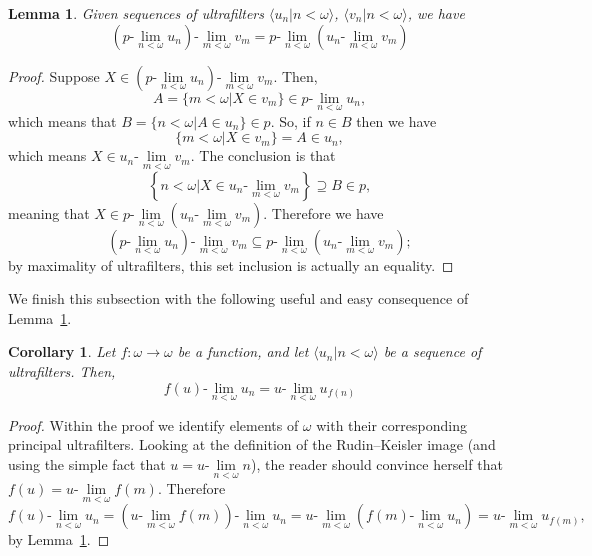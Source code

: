 \documentclass[10pt]{amsart}
\newcommand{\ulim}[2]{#1\text{-}\lim\limits_{#2<\omega}}
\newtheorem{lemma}[theorem]{Lemma}
\newtheorem{corollary}[theorem]{Corollary}
\theoremstyle{definition}
\theoremstyle{remark}
\begin{document}
\begin{lemma}\label{lem:iteratedulims}
    Given sequences of ultrafilters $\langle u_n\big|n<\omega\rangle$, $\langle v_n\big|n<\omega\rangle$, we have
\begin{equation*}
\ulim{\left(\ulim{p}{n}u_n\right)}{m} v_m=\ulim{p}{n}\left(\ulim{u_n}{m} v_m\right)
\end{equation*}
\end{lemma}

\begin{proof}
    Suppose $X\in\ulim{\left(\ulim{p}{n}u_n\right)}{m}v_m$. Then,
    \begin{equation*}
        A=\{m<\omega\big|X\in v_m\}\in\ulim{p}{n} u_n,
    \end{equation*}
    which means that $B=\{n<\omega\big|A\in u_n\}\in p$. So, if $n\in B$ then we have
    \begin{equation*}
        \{m<\omega\big|X\in v_m\}=A\in u_n,
    \end{equation*}
    which means $X\in\ulim{u_n}{m}v_m$. The conclusion is that
    \begin{equation*}
        \left\{n<\omega\big|X\in\ulim{u_n}{m}v_m\right\}\supseteq B\in p,
    \end{equation*}
    meaning that $X\in\ulim{p}{n}\left(\ulim{u_n}{m} v_m\right)$. Therefore we have
    \begin{equation*}
    \ulim{\left(\ulim{p}{n}u_n\right)}{m} v_m\subseteq\ulim{p}{n}\left(\ulim{u_n}{m} v_m\right);
    \end{equation*}
    by maximality of ultrafilters, this set inclusion is actually an equality.
\end{proof}

We finish this subsection with the following useful and easy consequence of Lemma~\ref{lem:iteratedulims}.

\begin{corollary}\label{lem:f(u)limit}
    Let $f:\omega\longrightarrow\omega$ be a function, and let $\langle u_n\big|n<\omega\rangle$ be a sequence of ultrafilters. Then,
    \begin{equation*}
        \ulim{f(u)}{n}u_n=\ulim{u}{n}u_{f(n)}
    \end{equation*}
\end{corollary}

\begin{proof}
    Within the proof we identify elements of $\omega$ with their corresponding principal ultrafilters. Looking at the definition of the Rudin--Keisler image (and using the simple fact that $u=\ulim{u}{n}n$), the reader should convince herself that $f(u)=\ulim{u}{m}f(m)$. Therefore
    \begin{equation*}
    \ulim{f(u)}{n}u_n=\ulim{\left(\ulim{u}{m}f(m)\right)}{n}u_n=\ulim{u}{m}\left(\ulim{f(m)}{n} u_n\right)=\ulim{u}{m}u_{f(m)},
    \end{equation*}
    by Lemma~\ref{lem:iteratedulims}.
\end{proof}
\end{document}
